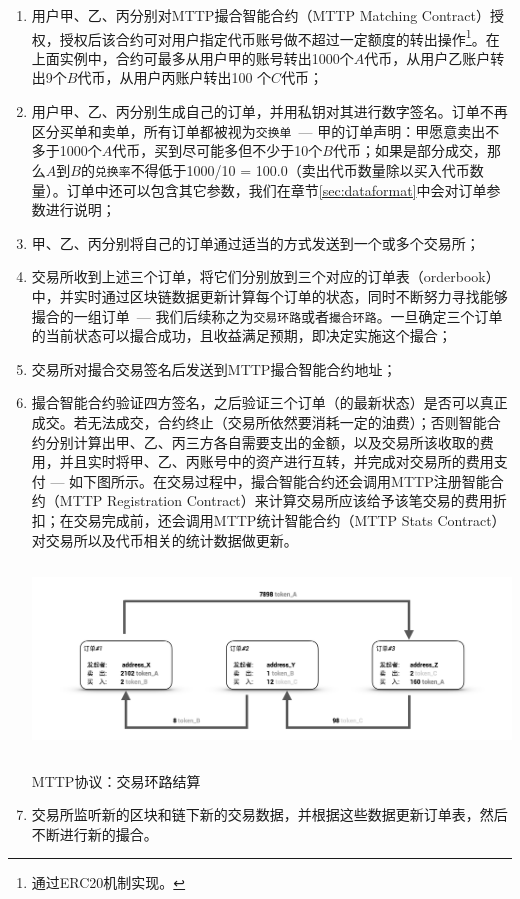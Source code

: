 \documentclass[UTF8,nofonts]{ctexart}
\makeatletter
\newenvironment{figurehere}
  {\def\@captype{figure}}
  {}
\makeatother
\begin{document}
\begin{enumerate}
  \item 用户甲、乙、丙分别对MTTP撮合智能合约（MTTP Matching Contract）授权，授权后该合约可对用户指定代币账号做不超过一定额度的转出操作\footnote{通过ERC20机制实现。}。在上面实例中，合约可最多从用户甲的账号转出1000个$A$代币，从用户乙账户转出9个$B$代币，从用户丙账户转出100 个$C$代币；
  \item 用户甲、乙、丙分别生成自己的订单，并用私钥对其进行数字签名。订单不再区分买单和卖单，所有订单都被视为\texttt{交换单}\ --- 甲的订单声明：甲愿意卖出不多于1000个$A$代币，买到尽可能多但不少于10个$B$代币；如果是部分成交，那么$A$到$B$的\texttt{兑换率}不得低于1000/10 = 100.0（卖出代币数量除以买入代币数量）。订单中还可以包含其它参数，我们在章节\ref{sec:dataformat}中会对订单参数进行说明；
  \item 甲、乙、丙分别将自己的订单通过适当的方式发送到一个或多个交易所；
  \item 交易所收到上述三个订单，将它们分别放到三个对应的订单表（orderbook）中，并实时通过区块链数据更新计算每个订单的状态，同时不断努力寻找能够撮合的一组订单\ --- 我们后续称之为\texttt{交易环路}或者\texttt{撮合环路}。一旦确定三个订单的当前状态可以撮合成功，且收益满足预期，即决定实施这个撮合；
  \item 交易所对撮合交易签名后发送到MTTP撮合智能合约地址；
  \item 撮合智能合约验证四方签名，之后验证三个订单（的最新状态）是否可以真正成交。若无法成交，合约终止（交易所依然要消耗一定的油费）；否则智能合约分别计算出甲、乙、丙三方各自需要支出的金额，以及交易所该收取的费用，并且实时将甲、乙、丙账号中的资产进行互转，并完成对交易所的费用支付 --- 如下图所示。在交易过程中，撮合智能合约还会调用MTTP注册智能合约（MTTP Registration Contract）来计算交易所应该给予该笔交易的费用折扣；在交易完成前，还会调用MTTP统计智能合约（MTTP Stats Contract）对交易所以及代币相关的统计数据做更新。

\begin{center}
\begin{figurehere}
\includegraphics[height=5cm]{images/zh-mttp-example.png}
\caption{MTTP协议：交易环路结算}
\label{fig:MTTPprotocol}
\end{figurehere}
\end{center}
  
  \item 交易所监听新的区块和链下新的交易数据，并根据这些数据更新订单表，然后不断进行新的撮合。
\end{enumerate}
\end{document}
